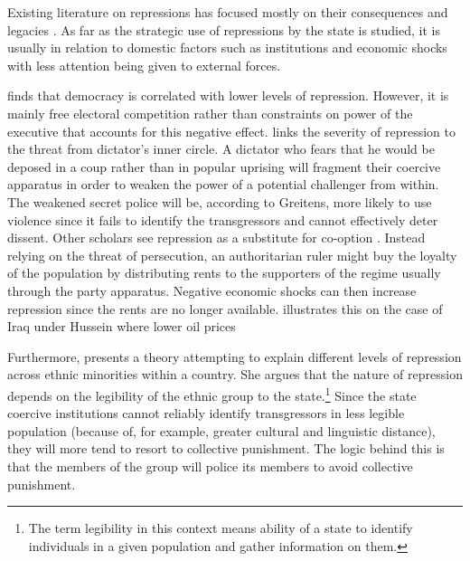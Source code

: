 Existing literature on repressions has focused mostly on their consequences and legacies \citep{rozenas_political_2017, lupu_legacy_2017, zhukov_stalins_2018}. As far as the strategic use of repressions by the state is studied, it is usually in relation to domestic factors such as institutions and economic shocks \citep{davenport_state_2007-1, greitens_dictators_2016, blaydes_state_2018} with less attention being given to external forces. 

\citet{davenport_state_2007-1} finds that democracy is correlated with lower levels of repression. However, it is mainly free electoral competition rather than constraints on power of the executive that accounts for this negative effect.  
\citet{greitens_dictators_2016} links the severity of repression to the threat from dictator's inner circle. A dictator who fears that he would be deposed in a coup rather than in popular uprising will fragment their coercive apparatus in order to weaken the power of a potential challenger from within. The weakened secret police will be, according to Greitens, more likely to use violence since it fails to identify the transgressors and cannot effectively deter dissent. 
Other scholars see repression as a substitute for co-option \citep{wintrobe_political_1998, svolik_politics_2012}. Instead relying on the threat of persecution, an authoritarian ruler might buy the loyalty of the population by distributing rents to the supporters of the regime usually through the party apparatus. Negative economic shocks can then increase repression since the rents are no longer available.  \citet{blaydes_state_2018} 
illustrates this on the case of Iraq under Hussein where lower oil prices 

Furthermore, \citet{blaydes_state_2018} presents a theory attempting to explain different levels of repression across ethnic minorities within a country. She argues that the nature of repression  depends on the legibility of the ethnic group to the state.\footnote{The term legibility in this context means ability of a state to identify individuals in a given population and gather information on them.}
 Since the state coercive institutions cannot reliably identify transgressors in  less legible population (because of, for example, greater cultural and linguistic distance), they will more tend to resort to collective punishment. The logic behind this is that the members of the group will police its members to avoid collective punishment. 


